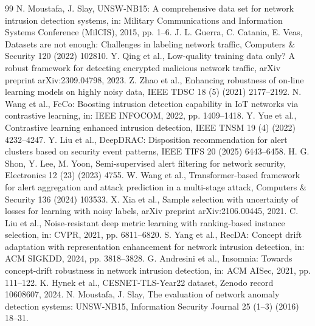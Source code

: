 \documentclass[pdflatex,referee,lineno,sn-basic,Numbered]{sn-jnl}
\begin{document}
\begin{thebibliography}{99}
 N. Moustafa, J. Slay, UNSW-NB15: A comprehensive data
set for network intrusion detection systems, in: Military Communications and
Information Systems Conference (MilCIS), 2015, pp. 1--6.
 J. L. Guerra, C. Catania, E. Veas, Datasets are not
enough: Challenges in labeling network traffic, Computers \& Security 120
(2022) 102810.
 Y. Qing et al., Low-quality training data only? A
robust framework for detecting encrypted malicious network traffic, arXiv
preprint arXiv:2309.04798, 2023.
 Z. Zhao et al., Enhancing robustness of on-line
learning models on highly noisy data, IEEE TDSC 18 (5) (2021) 2177--2192.
 N. Wang et al., FeCo: Boosting intrusion detection
capability in IoT networks via contrastive learning, in: IEEE INFOCOM, 2022,
pp. 1409--1418.
 Y. Yue et al., Contrastive learning enhanced intrusion
detection, IEEE TNSM 19 (4) (2022) 4232--4247.
 Y. Liu et al., DeepDRAC: Disposition recommendation
for alert clusters based on security event patterns, IEEE TIFS 20 (2025)
6443--6458.
 H. G. Shon, Y. Lee, M. Yoon, Semi-supervised alert
filtering for network security, Electronics 12 (23) (2023) 4755.
 W. Wang et al., Transformer-based framework for
alert aggregation and attack prediction in a multi-stage attack, Computers
\& Security 136 (2024) 103533.
 X. Xia et al., Sample selection with uncertainty of
losses for learning with noisy labels, arXiv preprint arXiv:2106.00445, 2021.
 C. Liu et al., Noise-resistant deep metric learning with
ranking-based instance selection, in: CVPR, 2021, pp. 6811--6820.
 S. Yang et al., RecDA: Concept drift adaptation with
representation enhancement for network intrusion detection, in: ACM SIGKDD,
2024, pp. 3818--3828.
 G. Andresini et al., Insomnia: Towards
concept-drift robustness in network intrusion detection, in: ACM AISec, 2021,
pp. 111--122.
 K. Hynek et al., CESNET-TLS-Year22 dataset, Zenodo
record 10608607, 2024.
 N. Moustafa, J. Slay, The evaluation of network
anomaly detection systems: UNSW-NB15, Information Security Journal 25 (1--3)
(2016) 18--31.
\end{thebibliography}
\end{document}
